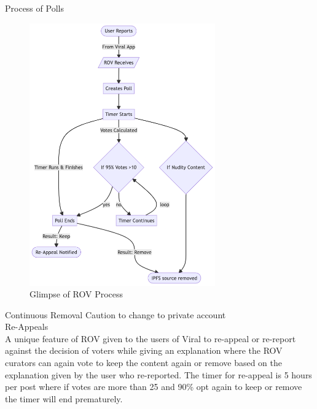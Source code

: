 \documentclass[10pt]{article}
\begin{document}
Process of Polls\\


\begin{figure}[H]
\begin{center}
\includegraphics[width=8cm]{rov-poll}
\caption{Glimpse of ROV Process}
\end{center}
\end{figure}

Continuous Removal Caution to change to private account\\

Re-Appeals\\

A unique feature of ROV given to the users of Viral to re-appeal or re-report against the decision of voters while giving an explanation where the ROV curators can again vote to keep the content again or remove based on the explanation given by the user who re-reported. The timer for re-appeal is 5 hours per post where if votes are more than 25 and 90\% opt again to keep or remove the timer will end prematurely.\\
\end{document}
